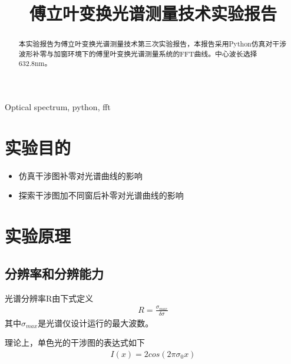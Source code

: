 \documentclass[conference]{IEEEtran}
\begin{document}
\title{傅立叶变换光谱测量技术实验报告}

\author{
}

\maketitle

\begin{abstract}
    本实验报告为傅立叶变换光谱测量技术第三次实验报告，本报告采用Python仿真对干涉波形补零与加窗环境下的傅里叶变换光谱测量系统的FFT曲线。中心波长选择632.8nm。
\end{abstract}

\begin{IEEEkeywords}
    Optical spectrum, python, fft
\end{IEEEkeywords}

\section{实验目的}
\begin{itemize}
    \item 仿真干涉图补零对光谱曲线的影响
    \item 探索干涉图加不同窗后补零对光谱曲线的影响
\end{itemize}

\section{实验原理}

\subsection{分辨率和分辨能力}

光谱分辨率R由下式定义
\begin{align}
    R = \frac{\sigma_{max}}{\delta \sigma}
\end{align}
其中$\sigma_{max}$是光谱仪设计运行的最大波数。

理论上，单色光的干涉图的表达式如下
\begin{align}
    I(x) = 2cos(2\pi \sigma_0 x)
\end{align}
\end{document}
